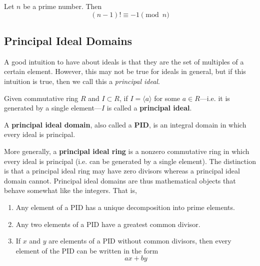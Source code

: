   \begin{theorem}
    Let $n$ be a prime number. Then 
    \begin{equation}
      (n-1)! \equiv -1 \pmod{n}
    \end{equation}
  \end{theorem}

\subsection{Principal Ideal Domains} 

  A good intuition to have about ideals is that they are the set of multiples of a certain element. However, this may not be true for ideals in general, but if this intuition is true, then we call this a \textit{principal ideal}. 

  \begin{definition}
    Given commutative ring $R$ and $I \subset R$, if $I = \langle a \rangle$ for some $a \in R$---i.e. it is generated by a single element---$I$ is called a \textbf{principal ideal}. 
  \end{definition}

  \begin{definition}
    A \textbf{principal ideal domain}, also called a \textbf{PID}, is an integral domain in which every ideal is principal. 
  \end{definition}

  More generally, a \textbf{principal ideal ring} is a nonzero commutative ring in which every ideal is principal (i.e. can be generated by a single element). The distinction is that a principal ideal ring may have zero divisors whereas a principal ideal domain cannot. Principal ideal domains are thus mathematical objects that behave somewhat like the integers. That is, 
  \begin{enumerate}
    \item Any element of a PID has a unique decomposition into prime elements. 
    \item Any two elements of a PID have a greatest common divisor. 
    \item If $x$ and $y$ are elements of a PID without common divisors, then every element of the PID can be written in the form 
      \begin{equation}
        a x + b y
      \end{equation}
  \end{enumerate}

